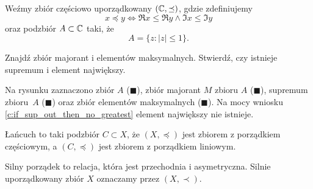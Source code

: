 \begin{example}
    Weźmy zbiór częściowo uporządkowany $(\mathbb C, \preceq)$, gdzie zdefiniujemy
    $$ x \preceq y \iff \Re{x} \leq \Re{y} \wedge \Im{x} \leq \Im{y} $$
    oraz podzbiór $A \subset \mathbb C$ taki, że
    $$ A = \{z : |z| \leq 1\}. $$

    Znajdź zbiór majorant i elementów maksymalnych. Stwierdź, czy istnieje supremum i element największy.
\end{example}
\begin{solution}
    Na rysunku zaznaczono zbiór $A$ (\textcolor{AccColor1}{$\blacksquare$}), zbiór majorant $M$ zbioru $A$ (\textcolor{AccColor2}{$\blacksquare$}), supremum zbioru~$A$ (\textcolor{AccColor3}{$\blacksquare$}) oraz zbiór elementów maksymalnych (\textcolor{AccColor4}{$\blacksquare$}). Na mocy wniosku \ref{c:if_sup_out_then_no_greatest} element największy nie istnieje.

    \begin{center}
    \end{center}
\end{solution}

\begin{definition}
    Łańcuch to taki podzbiór $C \subset X$, że $(X, \preceq)$ jest zbiorem z porządkiem częściowym, a $(C, \preceq)$ jest zbiorem z porządkiem liniowym.
\end{definition}

\begin{definition}
    Silny porządek to relacja, która jest przechodnia i asymetryczna. Silnie uporządkowany zbiór $X$ oznaczamy przez $(X, \prec)$.
\end{definition}
